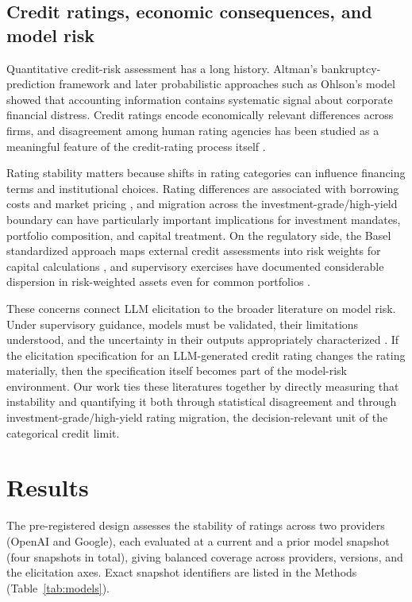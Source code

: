 \documentclass[a4paper,fleqn]{cas-sc}
\begin{document}
\subsection{Credit ratings, economic consequences, and model risk}
Quantitative credit-risk assessment has a long history. Altman's bankruptcy-prediction framework
\citep{altman1968} and later probabilistic approaches such as Ohlson's model \citep{ohlson1980} showed
that accounting information contains systematic signal about corporate financial distress. Credit ratings
encode economically relevant differences across firms, and disagreement among human rating agencies has
been studied as a meaningful feature of the credit-rating process itself
\citep{cantorpacker1997,kligersarig2000,tang2009}.

Rating stability matters because shifts in rating categories can influence financing terms and
institutional choices. Rating differences are associated with borrowing costs and
market pricing \citep{kligersarig2000,tang2009,cornaggia2018}, and migration across the
investment-grade/high-yield boundary can have particularly important implications for investment
mandates, portfolio composition, and capital treatment. On the regulatory side, the Basel standardized
approach maps external credit assessments into risk weights for capital calculations
\citep{bcbs2019cre20}, and supervisory exercises have documented considerable dispersion in risk-weighted
assets even for common portfolios \citep{bcbs2013rcap}.

These concerns connect LLM elicitation to the broader literature on model risk. Under supervisory
guidance, models must be validated, their limitations understood, and the uncertainty in their outputs
appropriately characterized \citep{srletter2011}. If the elicitation specification for an LLM-generated
credit rating changes the rating materially, then the specification itself becomes part of the model-risk
environment. Our work ties these literatures together by directly measuring that instability and
quantifying it both through statistical disagreement and through investment-grade/high-yield rating
migration, the decision-relevant unit of the categorical credit limit.

\section{Results}\label{sec:results}
The pre-registered design assesses the stability of ratings across two providers (OpenAI and Google),
each evaluated at a current and a prior model snapshot (four snapshots in total), giving balanced
coverage across providers, versions, and the elicitation axes. Exact snapshot identifiers are listed in
the Methods (Table~\ref{tab:models}).
\end{document}
